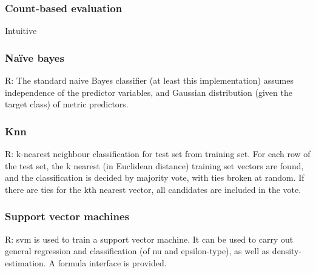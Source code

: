 




\subsubsection{Count-based evaluation}
Intuitive


\subsubsection{Na\"{i}ve bayes}
R: The standard naive Bayes classifier (at least this implementation) assumes independence of the predictor variables, and Gaussian distribution (given the target class) of metric predictors.

\subsubsection{Knn}
R: k-nearest neighbour classification for test set from training set. For each row of the test set, the k
nearest (in Euclidean distance) training set vectors are found, and the classification is decided by
majority vote, with ties broken at random. If there are ties for the kth nearest vector, all candidates
are included in the vote.

\subsubsection{Support vector machines}
R: svm is used to train a support vector machine. It can be used to carry out general regression and
classification (of nu and epsilon-type), as well as density-estimation. A formula interface is provided.
